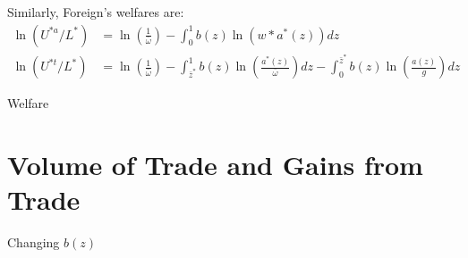 \documentclass[11pt]{article}
\begin{document}
Similarly, Foreign's welfares are:
\begin{align*}
    \ln (U^{* a} / L^*) &=\ln \left(\frac{1}{\bar{\omega}}\right)-\int_{0}^{1} b(z) \ln (w* a^*(z)) dz \\
    \ln (U^{* t} / L^*) &= \ln \left(\frac{1}{\bar{\omega}}\right) -\int_{\bar{z}^*}^{1} b(z) \ln \left(\frac{a^*(z)}{\bar{\omega}}\right) d z-\int_{0}^{\bar{z}^*} b(z) \ln \left(\frac{a(z) }{g}\right) d z
\end{align*}


\begin{table}[H]
    \centering
    \caption{Welfare}
    
\end{table}

\section{Volume of Trade and Gains from Trade}
\begin{table}[H]
    \centering
    \caption{Changing $b(z)$}
    
\end{table}
\end{document}
